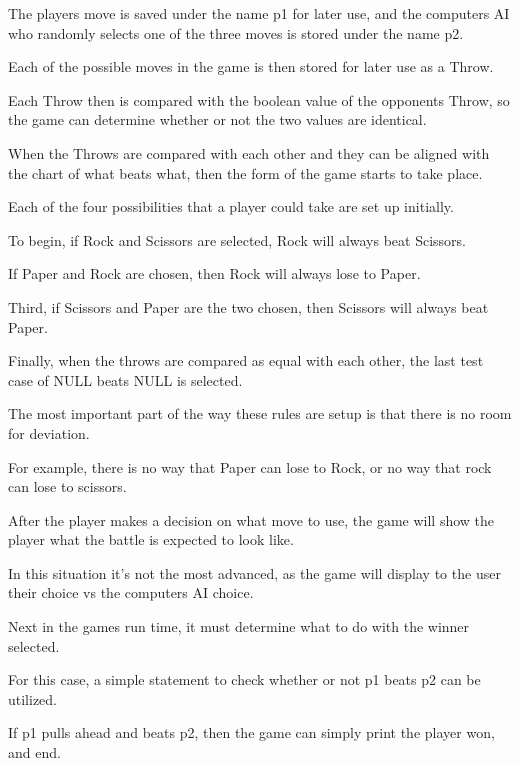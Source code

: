 \documentclass{article}
\begin{document}
\medskip\noindent
The players move is saved under the name p1 for later use, and the computers AI who randomly selects one of the three moves is stored under the name p2.

\medskip\noindent
Each of the possible moves in the game is then stored for later use as a Throw. 

\medskip\noindent
Each Throw then is compared with the boolean value of the opponents Throw, so the game can determine whether or not the two values are identical. 

\medskip\noindent
When the Throws are compared with each other and they can be aligned with the chart of what beats what, then the form of the game starts to take place.

\medskip\noindent
Each of the four possibilities that a player could take are set up initially.

\medskip\noindent
To begin, if Rock and Scissors are selected, Rock will always beat Scissors.

\medskip\noindent
If Paper and Rock are chosen, then Rock will always lose to Paper.

\medskip\noindent
Third, if Scissors and Paper are the two chosen, then Scissors will always beat Paper.

\medskip\noindent
Finally, when the throws are compared as equal with each other, the last test case of NULL beats NULL is selected. 

\medskip\noindent
The most important part of the way these rules are setup is that there is no room for deviation.

\medskip\noindent
For example, there is no way that Paper can lose to Rock, or no way that rock can lose to scissors.

\medskip\noindent
After the player makes a decision on what move to use, the game will show the player what the battle is expected to look like.

\medskip\noindent
In this situation it's not the most advanced, as the game will display to the user their choice vs the computers AI choice.

\medskip\noindent
Next in the games run time, it must determine what to do with the winner selected.

\medskip\noindent
For this case, a simple statement to check whether or not p1 beats p2 can be utilized.

\medskip\noindent
If p1 pulls ahead and beats p2, then the game can simply print the player won, and end.
\end{document}
